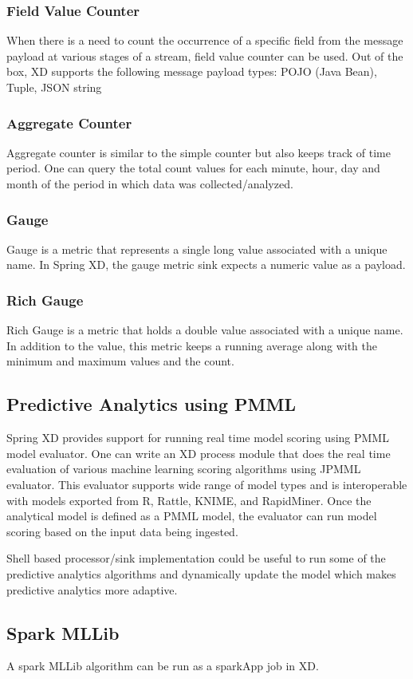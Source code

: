 \subsubsection {Field Value Counter}

When there is a need to count the occurrence of a specific field from the message 
payload at various stages of a stream, field value counter can be used. Out of the box,
XD supports the following message payload types:
POJO (Java Bean), Tuple, JSON string

\subsubsection {Aggregate Counter}

Aggregate counter is similar to the simple counter but also keeps track of time period.
One can query the total count values for each minute, hour, day and month of the period in
which data was collected/analyzed.

\subsubsection {Gauge}
Gauge is a metric that represents a single long value associated with a unique name.
In Spring XD, the gauge metric sink expects a numeric value as a payload.

\subsubsection {Rich Gauge}
Rich Gauge is a metric that holds a double value associated with a unique name. In 
addition to the value, this metric keeps a running average along with the minimum and 
maximum values and the count.

\subsection {Predictive Analytics using PMML}
Spring XD provides support for running real time model scoring using PMML model
evaluator. One can write an XD process module that does the real time evaluation of
various machine learning scoring algorithms using JPMML evaluator. This evaluator
supports wide range of model types and is interoperable with models exported from R,
Rattle, KNIME, and RapidMiner. Once the analytical model is defined as a PMML model,
the evaluator can run model scoring based on the input data being ingested.

\par

Shell based processor/sink implementation could be useful to run some of the
predictive analytics algorithms  and dynamically update the model which makes
predictive analytics more adaptive.

\subsection{Spark MLLib}
A spark MLLib algorithm can be run as a sparkApp job in XD.

